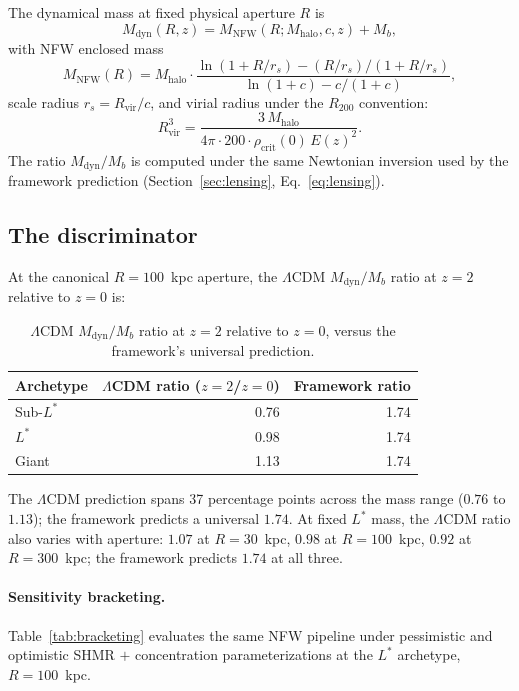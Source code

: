 \documentclass[11pt,a4paper]{article}
\numberwithin{equation}{section}
\numberwithin{table}{section}
\numberwithin{figure}{section}
\newcommand{\Mb}{M_b}
\newcommand{\Mdyn}{M_\text{dyn}}
\newcommand{\Ez}{E(z)}
\newcommand{\Mhalo}{M_\text{halo}}
\newcommand{\Rvir}{R_\text{vir}}
\newcommand{\rhocrit}{\rho_\text{crit}}
\newcommand{\NFW}{M_\text{NFW}}
\begin{document}
The dynamical mass at fixed physical aperture $R$ is
\begin{equation*}
\Mdyn(R, z) = \NFW(R; \Mhalo, c, z) + \Mb,
\end{equation*}
with NFW enclosed mass
\begin{equation*}
\NFW(R) = \Mhalo \cdot
\frac{\ln(1 + R/r_s) - (R/r_s)/(1 + R/r_s)}{\ln(1 + c) - c/(1 + c)},
\end{equation*}
scale radius $r_s = \Rvir/c$, and virial radius under the $R_{200}$
convention:
\begin{equation*}
\Rvir^3 = \frac{3\,\Mhalo}{4\pi \cdot 200 \cdot \rhocrit(0)\,\Ez^2}.
\end{equation*}
The ratio $\Mdyn/\Mb$ is computed under the same Newtonian inversion
used by the framework prediction (Section~\ref{sec:lensing},
Eq.~\ref{eq:lensing}).

\subsection{The discriminator}
\label{app:discriminator}

At the canonical $R = 100$~kpc aperture, the $\Lambda$CDM $\Mdyn/\Mb$
ratio at $z = 2$ relative to $z = 0$ is:

\begin{table}[!ht]
\centering
\caption{$\Lambda$CDM $\Mdyn/\Mb$ ratio at $z = 2$ relative to $z = 0$,
versus the framework's universal prediction.}
\label{tab:lcdm-archetypes}
\begin{tabular}{l r r}
\toprule
Archetype & $\Lambda$CDM ratio ($z{=}2$/$z{=}0$) & Framework ratio \\
\midrule
Sub-$L^*$ & 0.76 & 1.74 \\
$L^*$     & 0.98 & 1.74 \\
Giant     & 1.13 & 1.74 \\
\bottomrule
\end{tabular}
\end{table}

The $\Lambda$CDM prediction spans 37 percentage points across the mass
range ($0.76$ to $1.13$); the framework predicts a universal $1.74$. At
fixed $L^*$ mass, the $\Lambda$CDM ratio also varies with aperture:
$1.07$ at $R = 30$~kpc, $0.98$ at $R = 100$~kpc, $0.92$ at
$R = 300$~kpc; the framework predicts $1.74$ at all three.

\paragraph{Sensitivity bracketing.}
Table~\ref{tab:bracketing} evaluates the same NFW pipeline under
pessimistic and optimistic SHMR $+$ concentration parameterizations at
the $L^*$ archetype, $R = 100$~kpc.
\end{document}
